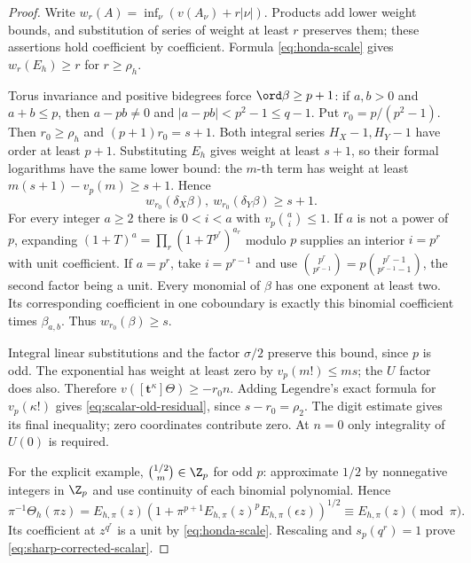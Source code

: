 \begin{proof}
Write $w_r(A)=\inf_\nu(v(A_\nu)+r|\nu|)$. Products add lower weight bounds, and substitution of series of weight at least $r$ preserves them; these assertions hold coefficient by coefficient. Formula \eqref{eq:honda-scale} gives $w_r(E_h)\ge r$ for $r\ge\rho_h$.

Torus invariance and positive bidegrees force $\ord\beta\ge p+1$: if $a,b>0$ and $a+b\le p$, then $a-pb\ne0$ and $|a-pb|<p^2-1\le q-1$. Put $r_0=p/(p^2-1)$. Then $r_0\ge\rho_h$ and $(p+1)r_0=s+1$. Both integral series $H_X-1,H_Y-1$ have order at least $p+1$. Substituting $E_h$ gives weight at least $s+1$, so their formal logarithms have the same lower bound: the $m$-th term has weight at least $m(s+1)-v_p(m)\ge s+1$. Hence
\[
 w_{r_0}(\delta_X\beta),\ w_{r_0}(\delta_Y\beta)\ge s+1.
\]
For every integer $a\ge2$ there is $0<i<a$ with $v_p\binom ai\le1$. If $a$ is not a power of $p$, expanding $(1+T)^a=\prod_r(1+T^{p^r})^{a_r}$ modulo $p$ supplies an interior $i=p^r$ with unit coefficient. If $a=p^r$, take $i=p^{r-1}$ and use $\binom{p^r}{p^{r-1}}=p\binom{p^r-1}{p^{r-1}-1}$, the second factor being a unit. Every monomial of $\beta$ has one exponent at least two. Its corresponding coefficient in one coboundary is exactly this binomial coefficient times $\beta_{a,b}$. Thus $w_{r_0}(\beta)\ge s$.

Integral linear substitutions and the factor $\sigma/2$ preserve this bound, since $p$ is odd. The exponential has weight at least zero by $v_p(m!)\le ms$; the $U$ factor does also. Therefore $v([\mathbf t^\kappa]\Theta)\ge-r_0n$. Adding Legendre's exact formula for $v_p(\kappa!)$ gives \eqref{eq:scalar-old-residual}, since $s-r_0=\rho_2$. The digit estimate gives its final inequality; zero coordinates contribute zero. At $n=0$ only integrality of $U(0)$ is required.

For the explicit example, $\binom{1/2}{m}\in\Z_p$ for odd $p$: approximate $1/2$ by nonnegative integers in $\Z_p$ and use continuity of each binomial polynomial. Hence
\[
 \pi^{-1}\Theta_h(\pi z)
 =E_{h,\pi}(z)\left(1+\pi^{p+1}E_{h,\pi}(z)^pE_{h,\pi}(\epsilon z)\right)^{1/2}
 \equiv E_{h,\pi}(z)\pmod\pi.
\]
Its coefficient at $z^{q^r}$ is a unit by \eqref{eq:honda-scale}. Rescaling and $s_p(q^r)=1$ prove \eqref{eq:sharp-corrected-scalar}.
\end{proof}
